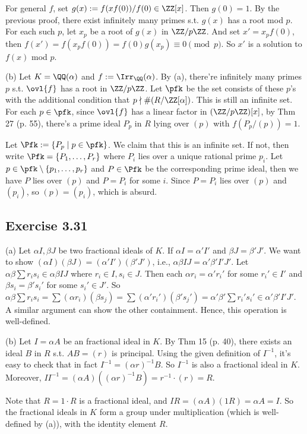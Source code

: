 \documentclass[../Chapter.tex]{subfiles}
\begin{document}
For general $f$, set $g(x):=f(xf(0))/f(0)\in\ZZ[x]$. Then $g(0)=1$. By the previous proof, there exist infinitely many primes s.t. $g(x)$ has a root mod $p$. For each such $p$, let $x_p$ be a root of $g(x)$ in $\ZZ/p\ZZ$. And set $x'=x_pf(0)$, then $f(x')=f(x_pf(0))=f(0)g(x_p)\equiv 0\pmod{p}$. So $x'$ is a solution to $f(x)$ mod $p$.

(b) Let $K=\QQ(\alpha)$ and $f:=\Irr_\QQ(\alpha)$. By (a), there're infinitely many primes $p$ s.t. $\ovl{f}$ has a root in $\ZZ/p\ZZ$. Let $\pfk$ be the set consists of these $p$'s with the additional condition that $p\nmid \#(R/\ZZ[\alpha])$. This is still an infinite set. For each $p\in\pfk$, since $\ovl{f}$ has a linear factor in $(\ZZ/p\ZZ)[x]$, by Thm 27 (p. 55), there's a prime ideal $P_p$ in $R$ lying over $(p)$ with $f(P_p/(p))=1$.

Let $\Pfk:=\{P_p\mid p\in\pfk\}$. We claim that this is an infinite set. If not, then write $\Pfk=\{P_1,\ldots,P_r\}$ where $P_i$ lies over a unique rational prime $p_i$. Let $p\in\pfk\setminus\{p_1,\ldots,p_r\}$ and $P\in\Pfk$ be the corresponding prime ideal, then we have $P$ lies over $(p)$ and $P=P_i$ for some $i$. Since $P=P_i$ lies over $(p)$ and $(p_i)$, so $(p)=(p_i)$, which is absurd.

\subsection*{Exercise 3.31}

(a) Let $\alpha I,\beta J$ be two fractional ideals of $K$. If $\alpha I=\alpha'I'$ and $\beta J=\beta'J'$. We want to show $(\alpha I)(\beta J)=(\alpha'I')(\beta'J')$, i.e., $\alpha\beta IJ=\alpha'\beta'I'J'$. Let $\alpha\beta\sum r_is_i\in\alpha\beta IJ$ where $r_i\in I,s_i\in J$. Then each $\alpha r_i=\alpha'r_i'$ for some $r_i'\in I'$ and $\beta s_i=\beta's_i'$ for some $s_i'\in J'$. So $\alpha\beta \sum r_is_i=\sum (\alpha r_i)(\beta s_j) = \sum (\alpha'r_i')(\beta's_j') = \alpha'\beta' \sum r_i's_i' \in \alpha'\beta' I'J'$. A similar argument can show the other containment. Hence, this operation is well-defined.

(b) Let $I=\alpha A$ be an fractional ideal in $K$. By Thm 15 (p. 40), there exists an ideal $B$ in $R$ s.t. $AB=(r)$ is principal. Using the given definition of $I^{-1}$, it's easy to check that in fact $I^{-1}=(\alpha r)^{-1}B$. So $I^{-1}$ is also a fractional ideal in $K$. Moreover, $II^{-1}=(\alpha A)((\alpha r)^{-1}B)=r^{-1}\cdot(r)=R$.

Note that $R=1\cdot R$ is a fractional ideal, and $IR=(\alpha A)(1R)=\alpha A=I$. So the fractional ideals in $K$ form a group under multiplication (which is well-defined by (a)), with the identity element $R$.
\end{document}
